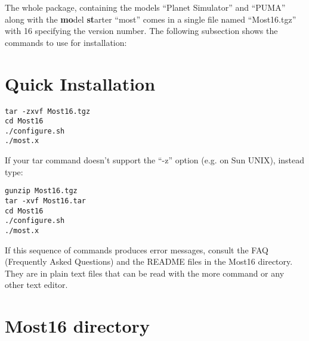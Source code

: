 The whole package, containing the models ``Planet Simulator'' and ``PUMA''
along with the {\bf mo}del {\bf st}arter ``most'' comes in a single file
named ``Most16.tgz'' with 16 specifying the version number.
The following subsection shows the commands to use for installation:

\section{Quick Installation}

\begin{verbatim}
tar -zxvf Most16.tgz
cd Most16
./configure.sh
./most.x
\end{verbatim}

If your tar command doesn't support the ``-z'' option (e.g. on Sun UNIX),
instead type:

\begin{verbatim}
gunzip Most16.tgz
tar -xvf Most16.tar
cd Most16
./configure.sh
./most.x
\end{verbatim}

If this sequence of commands produces error messages,
consult the FAQ (Frequently Asked Questions) and the README files
in the Most16 directory. They are in plain text files that can be read with
the more command or any other text editor.

\section{Most16 directory }

